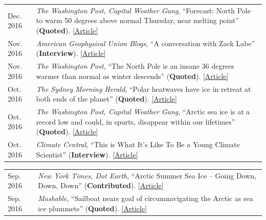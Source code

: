 \documentclass[margin,line,palatino,courier,10pt]{res}
\begin{document}
\begin{resume}
\begin{tabular}{@{}p{0.9in}p{4in}}
Dec. 2016 & \textit{The Washington Post, Capital Weather Gang}, ``Forecast: North Pole to warm 50 degrees above normal Thursday, near melting point'' (\textbf{Quoted}). \href{https://www.washingtonpost.com/news/capital-weather-gang/wp/2016/12/20/forecast-north-pole-to-warm-50-degrees-above-normal-thursday-near-melting-point/?dfgdfgdfgdfg&utm_term=.e648369ada7e}{[Article]}\\
Nov. 2016 & \textit{American Geophysical Union Blogs}, ``A conversation with Zack Labe'' (\textbf{Interview}). \href{http://blogs.agu.org/mountainbeltway/2016/11/23/conversation-zack-labe/}{[Article]}\\
Nov. 2016 & \textit{The Washington Post}, ``The North Pole is an insane 36 degrees warmer than normal as winter descends'' (\textbf{Quoted}). \href{https://www.washingtonpost.com/news/energy-environment/wp/2016/11/17/the-north-pole-is-an-insane-36-degrees-warmer-than-normal-as-winter-descends/?utm_term=.f2cb9596b3d8}{[Article]}\\
Oct. 2016 & \textit{The Sydney Morning Herald}, ``Polar heatwaves have ice in retreat at both ends of the planet'' (\textbf{Quoted}). \href{http://www.smh.com.au/environment/climate-change/polar-heatwaves-have-ice-in-retreat-at-both-ends-of-the-planet-20161030-gse9q6.html}{[Article]}\\
Oct. 2016 & \textit{The Washington Post, Capital Weather Gang}, ``Arctic sea ice is at a record low and could, in spurts, disappear within our lifetimes'' (\textbf{Quoted}). \href{https://www.washingtonpost.com/news/capital-weather-gang/wp/2016/10/27/arctic-sea-ice-is-at-a-record-low-and-could-in-spurts-disappear-within-our-lifetimes/}{[Article]}\\
Oct. 2016 & \textit{Climate Central}, ``This is What It's Like To Be a Young Climate Scientist'' (\textbf{Interview}). \href{http://www.climatecentral.org/news/young-climate-scientists-interviews-20799}{[Article]}\\
\end{tabular}
\begin{tabular}{@{}p{0.9in}p{4in}}
Sep. 2016 & \textit{New York Times, Dot Earth}, ``Arctic Summer Sea Ice -- Going Down, Down, Down'' (\textbf{Contributed}). \href{http://dotearth.blogs.nytimes.com/2016/09/16/arctic-summer-sea-ice-going-down-down-down/?module=BlogPost-ReadMore&version=Blog\%20Main&action=Click&contentCollection=arctic&pgtype=Blogs&region=Body&_r=1#more-58318}{[Article]}\\
Sep. 2016 & \textit{Mashable}, ``Sailboat nears goal of circumnavigating the Arctic as sea ice plummets'' (\textbf{Quoted}). \href{http://mashable.com/2016/09/01/sailboat-arctic-ice-melt-open-water/#s7nzft8m6sqB}{[Article]}\\

\end{tabular}
\end{resume}
\end{document}
